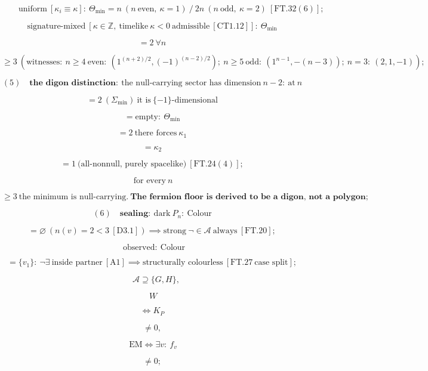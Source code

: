 \begin{theorem}
\[
\qquad \text{uniform}\ [\kappa_i\equiv\kappa]:\ \Theta_{\min}=n\ (n\ \text{even},\ \kappa{=}1)\ /\ 2n\ (n\ \text{odd},\ \kappa{=}2)\ [\mathrm{FT.32}(6)];
\]

\[
\text{signature-mixed}\ [\kappa\in\mathbb Z,\ \text{timelike}\ \kappa<0\ \text{admissible}\ [\mathrm{CT1.12}]]:\ \Theta_{\min}
\]

\[
= 2\ \forall n
\]

\[
\ge 3\ (\text{witnesses}:\ n\ge4\ \text{even}:\ (1^{(n+2)/2},(-1)^{(n-2)/2});\ n\ge5\ \text{odd}:\ (1^{n-1},-(n-3));\ n{=}3:\ (2,1,-1));
\]

\[
(5)\quad\textbf{the digon distinction}:\ \text{the null-carrying sector has dimension}\ n-2:\ \text{at}\ n
\]

\[
= 2\ (\Sigma_{\min})\ \text{it is}\ \{-1\}\text{-dimensional}
\]

\[
= \text{empty}:\ \Theta_{\min}
\]

\[
= 2\ \text{there forces}\ \kappa_1
\]

\[
= \kappa_2
\]

\[
= 1\ \text{(all-nonnull, purely spacelike)}\ [\mathrm{FT.24}(4)];
\]

\[
\ \text{for every}\ n
\]

\[
\ge 3\ \text{the minimum is null-carrying}.\ \textbf{The fermion floor is derived to be a digon, not a polygon};
\]

\[
(6)\quad\textbf{sealing}:\ \text{dark}\ P_n:\ \mathrm{Colour}
\]

\[
= \varnothing\ (n(v)=2<3\ [\mathrm{D3.1}])\implies\text{strong}\ \neg\in\mathcal A\ \text{always}\ [\mathrm{FT.20}];
\]

\[
\ \ \text{observed}:\ \mathrm{Colour}
\]

\[
= \{v_1\}:\ \neg\exists\ \text{inside partner}\ [\mathrm{A1}]\implies\text{structurally colourless}\ [\mathrm{FT.27}\ \text{case split}];
\]

\[
\quad\mathcal A\supseteq\{G,H\},
\]

\[
\ W
\]

\[
\iff K_P
\]

\[
\ne 0,
\]

\[
\ \mathrm{EM}\iff\exists v:\ f_v
\]

\[
\ne 0;
\]


\end{theorem}
